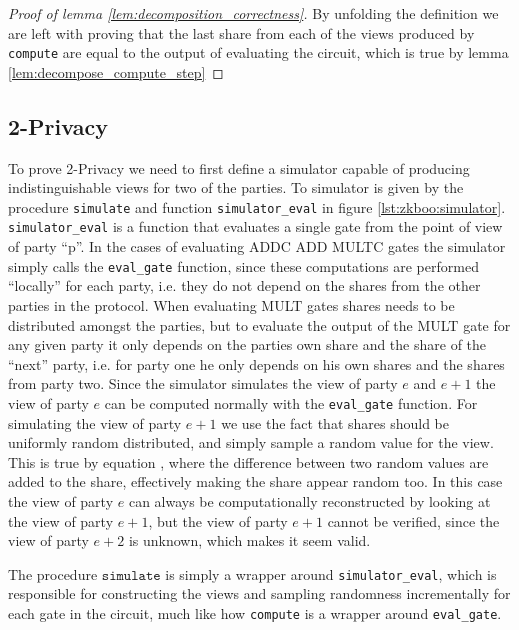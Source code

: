 \begin{proof}[Proof of lemma \ref{lem:decomposition_correctness}]
  By unfolding the definition we are left with proving that the last share from
  each of the views produced by \texttt{compute} are equal to the output of
  evaluating the circuit, which is true by lemma \ref{lem:decompose_compute_step}
\end{proof}



\subsection{2-Privacy}
\label{sec:decomp_privacy}
To prove 2-Privacy we need to first define a simulator capable of producing
indistinguishable views for two of the parties. To simulator is given by the
procedure \texttt{simulate} and function \texttt{simulator\_eval} in figure \ref{lst:zkboo:simulator}.
\texttt{simulator\_eval} is a function that evaluates a single gate from the
point of view of party ``p''. In the cases of evaluating ADDC ADD MULTC gates
the simulator simply calls the \texttt{eval\_gate} function, since these
computations are performed ``locally'' for each party, i.e. they do not depend
on the shares from the other parties in the protocol.
When evaluating MULT gates shares needs to be distributed amongst the parties,
but to evaluate the output of the MULT gate for any given party it only depends
on the parties own share and the share of the ``next'' party, i.e. for party one
he only depends on his own shares and the shares from party two. Since
the simulator simulates the view of party $e$ and $e+1$ the view of party $e$
can be computed normally with the \texttt{eval\_gate} function. For simulating
the view of party $e+1$ we use the fact that shares should be uniformly random
distributed, and simply sample a random value for the view.
This is true by equation , where
the difference between two random values are added to the share, effectively
making the share appear random too.
In this case the view of party $e$ can always be computationally reconstructed
by looking at the view of party $e+1$, but the view of party $e+1$ cannot be
verified, since the view of party $e+2$ is unknown, which makes it seem valid.

The procedure $\texttt{simulate}$ is simply a wrapper around
\texttt{simulator\_eval}, which is responsible for constructing the views and
sampling randomness incrementally for each gate in the circuit, much like how \texttt{compute} is a wrapper around \texttt{eval\_gate}.

